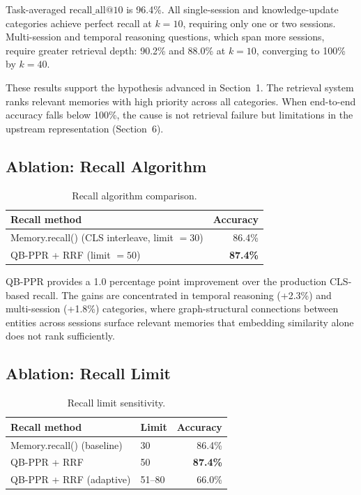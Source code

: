 \documentclass[11pt,a4paper]{article}
\begin{document}
Task-averaged $\text{recall\_all}@10$ is 96.4\%. All single-session and knowledge-update categories achieve perfect recall at $k = 10$, requiring only one or two sessions. Multi-session and temporal reasoning questions, which span more sessions, require greater retrieval depth: 90.2\% and 88.0\% at $k = 10$, converging to 100\% by $k = 40$.

These results support the hypothesis advanced in Section~1. The retrieval system ranks relevant memories with high priority across all categories. When end-to-end accuracy falls below 100\%, the cause is not retrieval failure but limitations in the upstream representation (Section~6).

\subsection{Ablation: Recall Algorithm}

\begin{table}[h]
\centering
\caption{Recall algorithm comparison.}
\label{tab:ablation-algo}
\begin{tabular}{@{}lr@{}}
\toprule
Recall method & Accuracy \\
\midrule
Memory.recall() (CLS interleave, limit $= 30$) & 86.4\% \\
QB-PPR + RRF (limit $= 50$)                     & \textbf{87.4\%} \\
\bottomrule
\end{tabular}
\end{table}

QB-PPR provides a 1.0 percentage point improvement over the production CLS-based recall. The gains are concentrated in temporal reasoning (+2.3\%) and multi-session (+1.8\%) categories, where graph-structural connections between entities across sessions surface relevant memories that embedding similarity alone does not rank sufficiently.

\subsection{Ablation: Recall Limit}

\begin{table}[h]
\centering
\caption{Recall limit sensitivity.}
\label{tab:ablation-limit}
\begin{tabular}{@{}llr@{}}
\toprule
Recall method & Limit & Accuracy \\
\midrule
Memory.recall() (baseline) & 30    & 86.4\% \\
QB-PPR + RRF               & 50    & \textbf{87.4\%} \\
QB-PPR + RRF (adaptive)    & 51--80 & 66.0\% \\
\bottomrule
\end{tabular}
\end{table}
\end{document}

